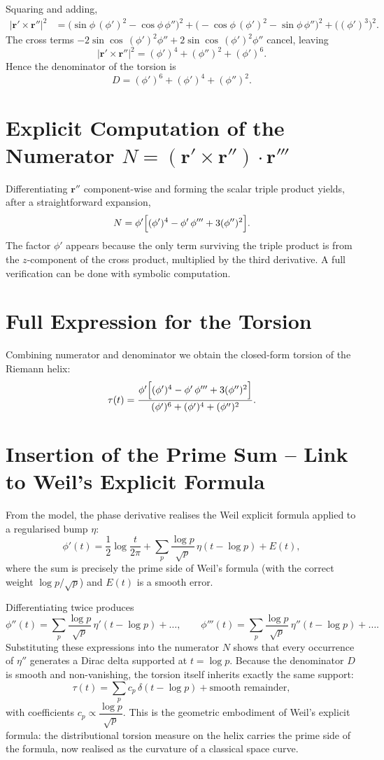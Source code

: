 \documentclass[11pt,a4paper]{article}
\begin{document}
Squaring and adding,
\begin{align*}
|\mathbf{r}'\times\mathbf{r}''|^2
&=\bigl(\sin\phi\,(\phi')^2-\cos\phi\,\phi''\bigr)^2
+\bigl(-\cos\phi\,(\phi')^2-\sin\phi\,\phi''\bigr)^2
+\bigl((\phi')^3\bigr)^2.
\end{align*}
The cross terms \(-2\sin\cos\,(\phi')^2\phi''+2\sin\cos\,(\phi')^2\phi''\) cancel, leaving
\[
|\mathbf{r}'\times\mathbf{r}''|^2=(\phi')^4+(\phi'')^2+(\phi')^6.
\]
Hence the denominator of the torsion is
\[
D=(\phi')^6+(\phi')^4+(\phi'')^2.
\]

\section{Explicit Computation of the Numerator \(N=(\mathbf{r}'\times\mathbf{r}'')\cdot\mathbf{r}'''\)}

Differentiating \(\mathbf{r}''\) component-wise and forming the scalar triple product yields, after a straightforward expansion,
\[
N=\phi'\Bigl[(\phi')^4-\phi'\,\phi'''+3(\phi'')^2\Bigr].
\]
The factor \(\phi'\) appears because the only term surviving the triple product is from the \(z\)-component of the cross product, multiplied by the third derivative. A full verification can be done with symbolic computation.

\section{Full Expression for the Torsion}

Combining numerator and denominator we obtain the closed-form torsion of the Riemann helix:
\[
\tau(t)=\frac{\phi'\Bigl[(\phi')^4-\phi'\,\phi'''+3(\phi'')^2\Bigr]}{(\phi')^6+(\phi')^4+(\phi'')^2}.
\]

\section{Insertion of the Prime Sum -- Link to Weil's Explicit Formula}

From the model, the phase derivative realises the Weil explicit formula applied to a regularised bump \(\eta\):
\[
\phi'(t)=\frac{1}{2}\log\frac{t}{2\pi}+\sum_{p}\frac{\log p}{\sqrt{p}}\,\eta(t-\log p)+E(t),
\]
where the sum is precisely the prime side of Weil's formula (with the correct weight \(\log p/\sqrt{p}\)) and \(E(t)\) is a smooth error.

Differentiating twice produces
\[
\phi''(t)=\sum_{p}\frac{\log p}{\sqrt{p}}\,\eta'(t-\log p)+\dots,\qquad
\phi'''(t)=\sum_{p}\frac{\log p}{\sqrt{p}}\,\eta''(t-\log p)+\dots.
\]
Substituting these expressions into the numerator \(N\) shows that every occurrence of \(\eta''\) generates a Dirac delta supported at \(t=\log p\). Because the denominator \(D\) is smooth and non-vanishing, the torsion itself inherits exactly the same support:
\[
\tau(t)=\sum_{p} c_p\,\delta(t-\log p)+\text{smooth remainder},
\]
with coefficients \(c_p\propto \dfrac{\log p}{\sqrt{p}}\). This is the geometric embodiment of Weil's explicit formula: the distributional torsion measure on the helix carries the prime side of the formula, now realised as the curvature of a classical space curve.
\end{document}
